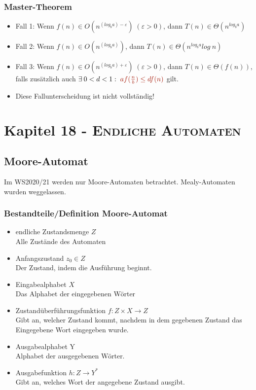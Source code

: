 \documentclass{article}
\newcommand{\kapitel}[2]{Kapitel #1 - \textsc{#2}}
\newcommand{\important}[1]{\textcolor{importantColor}{#1}}
\newcommand{\anfuehrung}[1]{\flqq #1\frqq}
\begin{document}
\subsubsection{Master-Theorem}
\begin{itemize}
    \item Fall 1: Wenn \important{$f(n)\in O(n^{(log_ba)-\varepsilon})$}$\;(\varepsilon>0)$, dann $T(n)\in \Theta(n^{log_ba})$
    \item Fall 2: Wenn \important{$f(n)\in O(n^{(log_ba)})$}, dann $T(n)\in \Theta(n^{log_ba}log\:n)$
    \item Fall 3: Wenn \important{$f(n)\in O(n^{(log_ba)+\varepsilon})$}$\;(\varepsilon>0)$, dann $T(n)\in \Theta(f(n))$,\\
    falls zusätzlich auch $\exists \:0<d<1:\;\important{af(\frac{n}{b})\leq df(n)}$ gilt.
    \item Diese Fallunterscheidung ist nicht vollständig!
\end{itemize}

\newpage
\section{\kapitel{18}{Endliche Automaten}}
\subsection{Moore-Automat}
Im WS2020/21 werden nur \important{Moore-Automaten} betrachtet. Mealy-Automaten wurden weggelassen.
\subsubsection{Bestandteile/Definition Moore-Automat}
\begin{itemize}
    \item endliche \important{Zustandsmenge $Z$}\\
    Alle Zustände des Automaten
    \item \important{Anfangszustand} $z_0\in Z$\\
    Der Zustand, indem die \anfuehrung{Ausführung} beginnt.
    \item \important{Eingabealphabet} $X$\\
    Das Alphabet der eingegebenen Wörter
    \item \important{Zustandüberführungsfunktion} $f:Z\times X\to Z$\\
    Gibt an, welcher Zustand kommt, nachdem in dem gegebenen Zustand das Eingegebene Wort eingegeben wurde. 
    \item \important{Ausgabealphabet} Y\\
    Alphabet der ausgegebenen Wörter.
    \item \important{Ausgabefunktion} $h: Z\to Y^*$\\
    Gibt an, welches Wort der angegebene Zustand ausgibt. 
\end{itemize}
\end{document}
